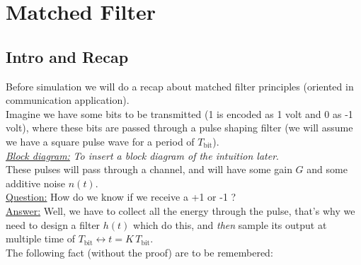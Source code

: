 

\chapter{Matched Filter}

\section{Intro and Recap}


Before simulation we will do a recap about matched filter principles (oriented in communication application).\\

Imagine we have some bits to be transmitted (1 is encoded as 1 volt and 0 as -1 volt), where these bits are passed through a pulse shaping filter (we will assume we have a square pulse wave for a period of $T_{\text{bit}}$).\\

 \underline{\textit{Block diagram:}}  \textit{To insert a block diagram of the intuition later}.\\

These pulses will pass through a channel, and will have some gain $G$ and some additive noise $n(t)$. \\ 

\underline{Question:} How do we know if we receive a +1 or -1 ?\\

\underline{Answer:} Well, we have to collect all the energy through the pulse, that's why we need to design a filter $h(t)$ which do this, and \textit{then} sample its output at multiple time of $T_{\text{bit}} \leftrightarrow t = K \, T_{\text{bit}}$.\\

The following fact (without the proof) are to be remembered:

